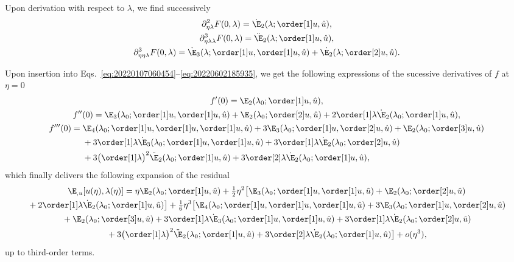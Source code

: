Upon derivation with respect to $\lambda$, we find successively
\begin{gather*}
  \partial_{\eta\lambda}^2 F(0, \lambda) = \dot{\E}_2(\lambda; \order[1]u, \hat{u}),\\
  \partial_{\eta\lambda\lambda}^3 F(0, \lambda) = \ddot{\E}_2(\lambda; \order[1]u, \hat{u}),\\
  \partial_{\eta\eta\lambda}^3 F(0, \lambda) = \dot{\E}_3(\lambda; \order[1]u, \order[1]u, \hat{u}) + \dot{\E_2}(\lambda; \order[2]u, \hat{u}).
\end{gather*}

Upon insertion into Eqs.~\eqref{eq:20220107060454}--\eqref{eq:20220602185935}, we get the following expressions of the
sucessive derivatives of $f$ at $\eta=0$
\begin{gather*}
  f'(0) = \E_2(\lambda_0; \order[1]u, \hat{u}),\\
  f''(0) = \E_3(\lambda_0; \order[1]u, \order[1]u, \hat{u}) + \E_2(\lambda_0; \order[2]u, \hat{u}) + 2 \order[1]\lambda \dot{\E}_2(\lambda_0; \order[1]u, \hat{u}),\\
  \begin{aligned}[b]
    f'''(0) ={}
    & \E_4(\lambda_0; \order[1]u, \order[1]u, \order[1]u, \hat{u}) + 3\E_3(\lambda_0; \order[1]u, \order[2]u, \hat{u}) + \E_2(\lambda_0 ; \order[3]u, \hat{u})\\
    & + 3\order[1]\lambda \dot{\E}_3(\lambda_0; \order[1]u, \order[1]u, \hat{u}) + 3\order[1]\lambda \dot{\E}_2(\lambda_0; \order[2]u, \hat{u})\\
    & + 3 \bigl( \order[1]\lambda \bigr)^2 \ddot{\E}_2(\lambda_0; \order[1]u, \hat{u}) + 3 \order[2]\lambda \dot{\E}_2(\lambda_0; \order[1]u, \hat{u}),
  \end{aligned}
\end{gather*}
which finally delivers the following expansion of the residual
\begin{equation}
  \label{eq:20220107080901}
  \begin{gathered}[b]
    \E_{, u}[u(\eta), \lambda(\eta)] ={} \eta \E_2(\lambda_0; \order[1]u, \hat{u}) + \tfrac{1}{2} \eta^2 \bigl[\E_3(\lambda_0; \order[1]u, \order[1]u, \hat{u})  + \E_2(\lambda_0; \order[2]u, \hat{u})\\
    {} + 2 \order[1]\lambda \dot{\E}_2(\lambda_0; \order[1]u, \hat{u})\bigr] + \tfrac{1}{6} \eta^3 \bigl[ \E_4(\lambda_0; \order[1]u, \order[1]u, \order[1]u, \hat{u}) + 3\E_3(\lambda_0; \order[1]u, \order[2]u, \hat{u})\\
    {} + \E_2(\lambda_0; \order[3]u, \hat{u}) + 3\order[1]\lambda \dot{\E}_3(\lambda_0; \order[1]u, \order[1]u, \hat{u}) + 3\order[1]\lambda \dot{\E}_2(\lambda_0; \order[2]u, \hat{u})\\
    {} + 3 \bigl( \order[1]\lambda \bigr)^2 \ddot{\E}_2(\lambda_0; \order[1]u, \hat{u}) + 3 \order[2]\lambda \dot{\E}_2(\lambda_0 ; \order[1]u, \hat{u}) \bigr] + o(\eta^3),
  \end{gathered}
\end{equation}
up to third-order terms.

